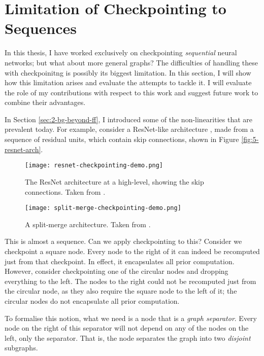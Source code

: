 \section{Limitation of Checkpointing to Sequences} \label{sec:5-qual-eval-seq-only}

In this thesis, I have worked exclusively on checkpointing \textit{sequential} neural networks; but what about more general graphs?
The difficulties of handling these with checkpoinitng is possibly its biggest limitation.
In this section, I will show how this limitation arises and evaluate the attempts to tackle it.
I will evaluate the role of my contributions with respect to this work and suggest future work to combine their advantages.

In Section \ref{sec:2-bg-beyond-ff}, I introduced some of the non-linearities that are prevalent today.
For example, consider a ResNet-like architecture \cite{He2016-resnet}, made from a sequence of residual units, which contain skip connections, shown in Figure \ref{fig:5-resnet-arch}.

\begin{figure}[b]
    \centering
    \texttt{[image: resnet-checkpointing-demo.png]}
    \caption{The ResNet architecture at a high-level, showing the skip connections. Taken from \cite{Bulatov-checkpointing-article}.}
    \label{fig:5-resnet-arch}
    \texttt{[image: split-merge-checkpointing-demo.png]}
    \caption{A split-merge architecture. Taken from \cite{Bulatov-checkpointing-article}.}
    \label{fig:5-split-merge-arch}
\end{figure}

This is almost a sequence.
Can we apply checkpointing to this?
Consider we checkpoint a square node.
Every node to the right of it can indeed be recomputed just from that checkpoint.
In effect, it encapsulates all prior computation.
However, consider checkpointing one of the circular nodes and dropping everything to the left.
The nodes to the right could not be recomputed just from the circular node, as they also require the square node to the left of it;
the circular nodes do not encapsulate all prior computation.

To formalise this notion, what we need is a node that is a \textit{graph separator}.
Every node on the right of this separator will not depend on any of the nodes on the left, only the separator.
That is, the node separates the graph into two \textit{disjoint} subgraphs.

